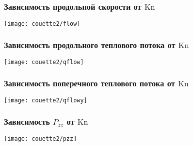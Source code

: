 \documentclass[mathserif]{beamer} %
\newcommand{\Kn}{\mathrm{Kn}}
\begin{document}
\begin{frame}
    \frametitle{Зависимость продольной скорости от \(\Kn\)}
    \vspace{-2pt}
    \centering\hspace{-1.5cm}
    \texttt{[image: couette2/flow]}
    \hspace{-1.5cm}
\end{frame}

\begin{frame}
    \frametitle{Зависимость продольного теплового потока от \(\Kn\)}
    \vspace{-2pt}
    \centering\hspace{-1.5cm}
    \texttt{[image: couette2/qflow]}
    \hspace{-1.5cm}
\end{frame}

\begin{frame}
    \frametitle{Зависимость поперечного теплового потока от \(\Kn\)}
    \vspace{-2pt}
    \centering\hspace{-1.5cm}
    \texttt{[image: couette2/qflowy]}
    \hspace{-1.5cm}
\end{frame}

\begin{frame}
    \frametitle{Зависимость \(P_{zz}\) от \(\Kn\)}
    \vspace{-2pt}
    \centering\hspace{-1.5cm}
    \texttt{[image: couette2/pzz]}
    \hspace{-1.5cm}
\end{frame}
\end{document}
